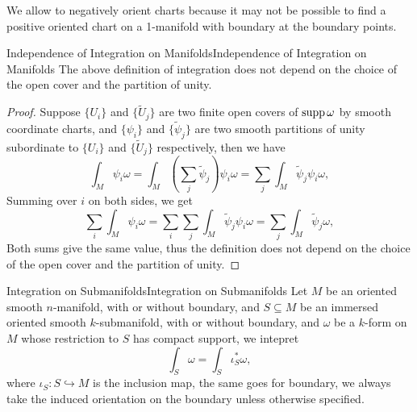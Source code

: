 \documentclass[../main.tex]{subfiles}
\begin{document}
\begin{remark}
  We allow to negatively orient charts because it may not be possible to find a positive oriented chart on a 1-manifold with boundary at the boundary points.
\end{remark}

\begin{proposition}{Independence of Integration on Manifolds}{Independence of Integration on Manifolds}
  The above definition of integration does not depend on the choice of the open cover and the partition of unity.
\end{proposition}
\begin{proof}
  Suppose $\{U_i\}$ and $\{\tilde{U}_j\}$ are two finite open covers of $\operatorname{supp} \omega$ by smooth coordinate charts, and $\{\psi_i\}$ and $\{\tilde{\psi}_j\}$ are two smooth partitions of unity subordinate to $\{U_i\}$ and $\{\tilde{U}_j\}$ respectively, then we have
  \begin{equation*}
    \int_M \psi_i \omega = \int_M \left(\sum_j \tilde{\psi}_j\right) \psi_i \omega = \sum_j \int_M \tilde{\psi}_j \psi_i \omega,
  \end{equation*}
  Summing over $i$ on both sides, we get
  \begin{equation*}
    \sum_i \int_M \psi_i \omega = \sum_i \sum_j \int_M \tilde{\psi}_j \psi_i \omega = \sum_j \int_M \tilde{\psi}_j \omega,
  \end{equation*}
  Both sums give the same value, thus the definition does not depend on the choice of the open cover and the partition of unity.
\end{proof}

\begin{definition}{Integration on Submanifolds}{Integration on Submanifolds}
  Let $M$ be an oriented smooth $n$-manifold, with or without boundary, and $S\subseteq M$ be an immersed oriented smooth $k$-submanifold, with or without boundary, and $\omega$ be a $k$-form on $M$ whose restriction to $S$ has compact support, we intepret
  \begin{equation}
    \int_S \omega = \int_S \iota_S^* \omega,
  \end{equation}
  where $\iota_S: S\hookrightarrow M$ is the inclusion map, the same goes for boundary, we always take the induced orientation on the boundary unless otherwise specified.
\end{definition}
\end{document}
